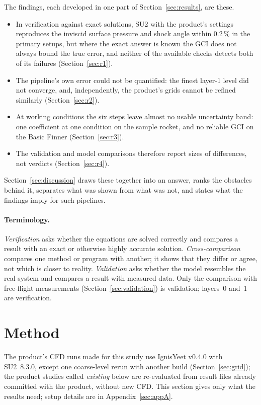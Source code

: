 \documentclass[twocolumn]{labreport}
\begin{document}
The findings, each developed in one part of Section~\ref{sec:results}, are these.
\begin{itemize}
\item In verification against exact solutions, SU2 with the product's settings reproduces the inviscid surface pressure and shock angle within 0.2\,\% in the primary setups, but where the exact answer is known the GCI does not always bound the true error, and neither of the available checks detects both of its failures (Section~\ref{sec:r1}).
\item The pipeline's own error could not be quantified: the finest layer-1 level did not converge, and, independently, the product's grids cannot be refined similarly (Section~\ref{sec:r2}).
\item At working conditions the six steps leave almost no usable uncertainty band: one coefficient at one condition on the sample rocket, and no reliable GCI on the Basic Finner (Section~\ref{sec:r3}).
\item The validation and model comparisons therefore report sizes of differences, not verdicts (Section~\ref{sec:r4}).
\end{itemize}
Section~\ref{sec:discussion} draws these together into an answer, ranks the obstacles behind it, separates what was shown from what was not, and states what the findings imply for such pipelines.

\paragraph{Terminology.}
\emph{Verification} asks whether the equations are solved correctly and compares a result with an exact or otherwise highly accurate solution.
\emph{Cross-comparison} compares one method or program with another; it shows that they differ or agree, not which is closer to reality.
\emph{Validation} asks whether the model resembles the real system and compares a result with measured data.
Only the comparison with free-flight measurements (Section~\ref{sec:validation}) is validation; layers~0 and~1 are verification.

\section{Method}
\label{sec:method}

The product's CFD runs made for this study use IgnisYeet v0.4.0 with SU2~8.3.0, except one coarse-level rerun with another build (Section~\ref{sec:grid}); the product studies called \emph{existing} below are re-evaluated from result files already committed with the product, without new CFD.
This section gives only what the results need; setup details are in Appendix~\ref{sec:appA}.
\end{document}
